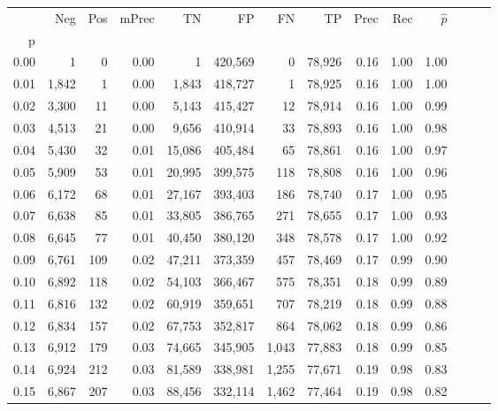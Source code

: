 \begin{tabular}{rrrrrrrrrrrrrr}
\toprule
{} &    Neg &    Pos & mPrec &       TN &       FP &      FN &      TP &  Prec &   Rec & $\hat{p}$ \\
p    &        &        &       &          &          &         &         &       &       &           \\
\midrule
0.00 &      1 &      0 &  0.00 &        1 &  420,569 &       0 &  78,926 &  0.16 &  1.00 &      1.00 \\
0.01 &  1,842 &      1 &  0.00 &    1,843 &  418,727 &       1 &  78,925 &  0.16 &  1.00 &      1.00 \\
0.02 &  3,300 &     11 &  0.00 &    5,143 &  415,427 &      12 &  78,914 &  0.16 &  1.00 &      0.99 \\
0.03 &  4,513 &     21 &  0.00 &    9,656 &  410,914 &      33 &  78,893 &  0.16 &  1.00 &      0.98 \\
0.04 &  5,430 &     32 &  0.01 &   15,086 &  405,484 &      65 &  78,861 &  0.16 &  1.00 &      0.97 \\
0.05 &  5,909 &     53 &  0.01 &   20,995 &  399,575 &     118 &  78,808 &  0.16 &  1.00 &      0.96 \\
0.06 &  6,172 &     68 &  0.01 &   27,167 &  393,403 &     186 &  78,740 &  0.17 &  1.00 &      0.95 \\
0.07 &  6,638 &     85 &  0.01 &   33,805 &  386,765 &     271 &  78,655 &  0.17 &  1.00 &      0.93 \\
0.08 &  6,645 &     77 &  0.01 &   40,450 &  380,120 &     348 &  78,578 &  0.17 &  1.00 &      0.92 \\
0.09 &  6,761 &    109 &  0.02 &   47,211 &  373,359 &     457 &  78,469 &  0.17 &  0.99 &      0.90 \\
0.10 &  6,892 &    118 &  0.02 &   54,103 &  366,467 &     575 &  78,351 &  0.18 &  0.99 &      0.89 \\
0.11 &  6,816 &    132 &  0.02 &   60,919 &  359,651 &     707 &  78,219 &  0.18 &  0.99 &      0.88 \\
0.12 &  6,834 &    157 &  0.02 &   67,753 &  352,817 &     864 &  78,062 &  0.18 &  0.99 &      0.86 \\
0.13 &  6,912 &    179 &  0.03 &   74,665 &  345,905 &   1,043 &  77,883 &  0.18 &  0.99 &      0.85 \\
0.14 &  6,924 &    212 &  0.03 &   81,589 &  338,981 &   1,255 &  77,671 &  0.19 &  0.98 &      0.83 \\
0.15 &  6,867 &    207 &  0.03 &   88,456 &  332,114 &   1,462 &  77,464 &  0.19 &  0.98 &      0.82 \\

\end{tabular}
